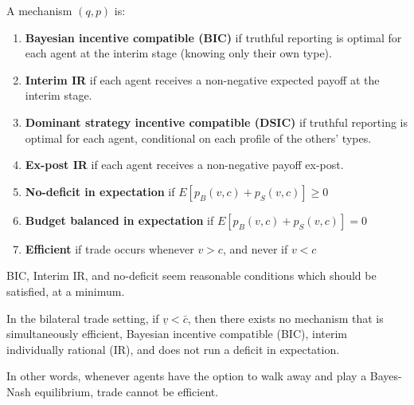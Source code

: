 \documentclass[11pt]{elegantbook_2}
\begin{document}
\begin{definition}
    A mechanism $(q,p)$ is:
    \begin{enumerate}
        \item \textbf{Bayesian incentive compatible (BIC)} if truthful reporting is optimal for each agent at the interim stage (knowing only their own type).
        \item \textbf{Interim IR} if each agent receives a non-negative expected payoff at the interim stage.
        \item \textbf{Dominant strategy incentive compatible (DSIC)} if truthful reporting is optimal for each agent, conditional on each profile of the others' types.
        \item \textbf{Ex-post IR} if each agent receives a non-negative payoff ex-post.
        \item \textbf{No-deficit in expectation} if $E[p_B(v,c)+p_S(v,c)]\geq 0$
        \item \textbf{Budget balanced in expectation} if $E[p_B(v,c)+p_S(v,c)]=0$
        \item \textbf{Efficient} if trade occurs whenever $v>c$, and never if $v<c$
    \end{enumerate}
\end{definition}

\begin{remark}
    BIC, Interim IR, and no-deficit seem reasonable conditions which should be satisfied, at a minimum.
\end{remark}


\begin{theorem}
    In the bilateral trade setting, if $\underline{v}<\bar{c}$, then there exists no mechanism that is simultaneously efficient, Bayesian incentive compatible (BIC), interim individually rational (IR), and does not run a deficit in expectation.
    
    In other words, whenever agents have the option to walk away and play a Bayes-Nash equilibrium, trade cannot be efficient.
\end{theorem}
\end{document}
